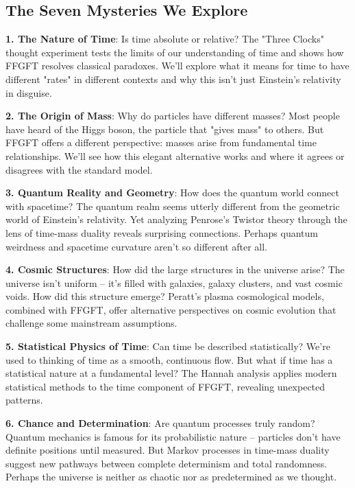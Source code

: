 \documentclass[11pt,openright,twoside]{book}
\begin{document}
\subsection*{The Seven Mysteries We Explore}

\textbf{1. The Nature of Time}: Is time absolute or relative? The "Three Clocks" thought experiment tests the limits of our understanding of time and shows how FFGFT resolves classical paradoxes. We'll explore what it means for time to have different "rates" in different contexts and why this isn't just Einstein's relativity in disguise.

\textbf{2. The Origin of Mass}: Why do particles have different masses? Most people have heard of the Higgs boson, the particle that "gives mass" to others. But FFGFT offers a different perspective: masses arise from fundamental time relationships. We'll see how this elegant alternative works and where it agrees or disagrees with the standard model.

\textbf{3. Quantum Reality and Geometry}: How does the quantum world connect with spacetime? The quantum realm seems utterly different from the geometric world of Einstein's relativity. Yet analyzing Penrose's Twistor theory through the lens of time-mass duality reveals surprising connections. Perhaps quantum weirdness and spacetime curvature aren't so different after all.

\textbf{4. Cosmic Structures}: How did the large structures in the universe arise? The universe isn't uniform – it's filled with galaxies, galaxy clusters, and vast cosmic voids. How did this structure emerge? Peratt's plasma cosmological models, combined with FFGFT, offer alternative perspectives on cosmic evolution that challenge some mainstream assumptions.

\textbf{5. Statistical Physics of Time}: Can time be described statistically? We're used to thinking of time as a smooth, continuous flow. But what if time has a statistical nature at a fundamental level? The Hannah analysis applies modern statistical methods to the time component of FFGFT, revealing unexpected patterns.

\textbf{6. Chance and Determination}: Are quantum processes truly random? Quantum mechanics is famous for its probabilistic nature – particles don't have definite positions until measured. But Markov processes in time-mass duality suggest new pathways between complete determinism and total randomness. Perhaps the universe is neither as chaotic nor as predetermined as we thought.
\end{document}
